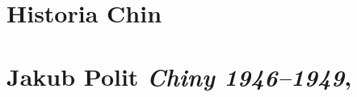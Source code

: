 \documentclass[a4paper,11pt]{article}
\numberwithin{equation}{section}
\begin{document}
\begin{center}
\begin{tabular}{|c|c|c|c|c|}
    \hline
  \end{tabular}

\end{center}

\VerSpaceTwo













\newpage

\section{Historia Chin}


\VerSpaceTwo



\section{Jakub Polit \textit{Chiny 1946--1949},
  \cite{PolitChiny1946Do1949Wyd2010}}









\VerSpaceFive
\end{document}
